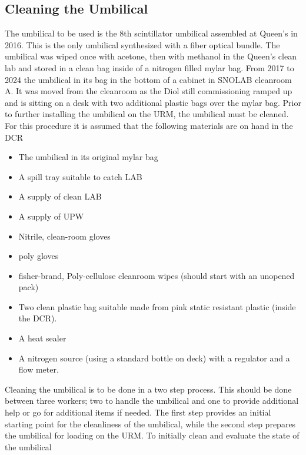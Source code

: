 \documentclass[11pt]{article}
\begin{document}
\subsection{Cleaning the Umbilical}\label{ss:cleanUmb}
The umbilical to be used is the 8th scintillator umbilical assembled
at Queen's in 2016. This is the only umbilical synthesized with a
fiber optical bundle. The umbilical was wiped once with acetone, then
with methanol in the Queen's clean lab and stored in a clean bag
inside of a nitrogen filled mylar bag. From 2017 to 2024 the umbilical
in its bag in the bottom of a cabinet in SNOLAB cleanroom A. It was
moved from the cleanroom as the Diol still commissioning ramped up and
is sitting on a desk with two additional plastic bags over the mylar
bag. Prior to further installing the umbilical on the URM, the
umbilical must be cleaned. For this procedure it is assumed that the
following materials are on hand in the DCR
\begin{itemize}
\item The umbilical in its original mylar bag
\item A spill tray suitable to catch LAB
\item A supply of clean LAB
\item A supply of UPW
\item Nitrile, clean-room gloves
\item poly gloves 
\item fisher-brand, Poly-cellulose cleanroom wipes (should start with an unopened pack)
\item Two clean plastic bag suitable made from pink static resistant plastic (inside the DCR).
\item A heat sealer
\item A nitrogen source (using a standard bottle on deck) with a regulator and a flow meter.
\end{itemize}
Cleaning the umbilical is to be done in a two step process. This
should be done between three workers; two to handle the umbilical and
one to provide additional help or go for additional items if needed. The first step provides an initial starting point for the cleanliness of the umbilical, while the second step prepares the umbilical for loading on the URM. To initially clean and evaluate the state of the umbilical
\end{document}
